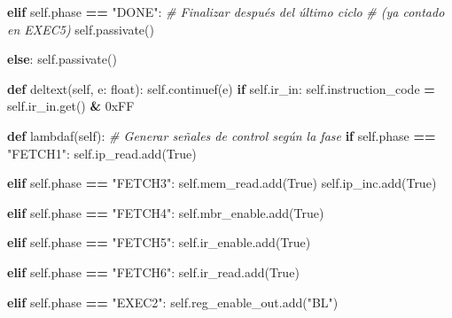 \documentclass[12pt,oneside]{templates/unerthesis}
\newenvironment{Shaded}{\begin{snugshade}}{\end{snugshade}}
\newcommand{\BaseNTok}[1]{\textcolor[rgb]{0.00,0.00,0.81}{#1}}
\newcommand{\BuiltInTok}[1]{#1}
\newcommand{\CommentTok}[1]{\textcolor[rgb]{0.56,0.35,0.01}{\textit{#1}}}
\newcommand{\ControlFlowTok}[1]{\textcolor[rgb]{0.13,0.29,0.53}{\textbf{#1}}}
\newcommand{\KeywordTok}[1]{\textcolor[rgb]{0.13,0.29,0.53}{\textbf{#1}}}
\newcommand{\NormalTok}[1]{#1}
\newcommand{\OperatorTok}[1]{\textcolor[rgb]{0.81,0.36,0.00}{\textbf{#1}}}
\newcommand{\StringTok}[1]{\textcolor[rgb]{0.31,0.60,0.02}{#1}}
\newcommand{\VariableTok}[1]{\textcolor[rgb]{0.00,0.00,0.00}{#1}}
\begin{document}
\begin{Shaded}
\begin{Highlighting}[]
        \ControlFlowTok{elif} \VariableTok{self}\NormalTok{.phase }\OperatorTok{==} \StringTok{"DONE"}\NormalTok{:}
            \CommentTok{\# Finalizar después del último ciclo }
            \CommentTok{\# (ya contado en EXEC5)}
            \VariableTok{self}\NormalTok{.passivate()}
        
        \ControlFlowTok{else}\NormalTok{:}
            \VariableTok{self}\NormalTok{.passivate()}
    
    \KeywordTok{def}\NormalTok{ deltext(}\VariableTok{self}\NormalTok{, e: }\BuiltInTok{float}\NormalTok{):}
        \VariableTok{self}\NormalTok{.continuef(e)}
        \ControlFlowTok{if} \VariableTok{self}\NormalTok{.ir\_in:}
            \VariableTok{self}\NormalTok{.instruction\_code }\OperatorTok{=} \VariableTok{self}\NormalTok{.ir\_in.get() }\OperatorTok{\&} \BaseNTok{0xFF}
    
    \KeywordTok{def}\NormalTok{ lambdaf(}\VariableTok{self}\NormalTok{):}
        \CommentTok{\# Generar señales de control según la fase}
        \ControlFlowTok{if} \VariableTok{self}\NormalTok{.phase }\OperatorTok{==} \StringTok{"FETCH1"}\NormalTok{:}
            \VariableTok{self}\NormalTok{.ip\_read.add(}\VariableTok{True}\NormalTok{)}
        
        \ControlFlowTok{elif} \VariableTok{self}\NormalTok{.phase }\OperatorTok{==} \StringTok{"FETCH3"}\NormalTok{:}
            \VariableTok{self}\NormalTok{.mem\_read.add(}\VariableTok{True}\NormalTok{)}
            \VariableTok{self}\NormalTok{.ip\_inc.add(}\VariableTok{True}\NormalTok{)}
        
        \ControlFlowTok{elif} \VariableTok{self}\NormalTok{.phase }\OperatorTok{==} \StringTok{"FETCH4"}\NormalTok{:}
            \VariableTok{self}\NormalTok{.mbr\_enable.add(}\VariableTok{True}\NormalTok{)}
        
        \ControlFlowTok{elif} \VariableTok{self}\NormalTok{.phase }\OperatorTok{==} \StringTok{"FETCH5"}\NormalTok{:}
            \VariableTok{self}\NormalTok{.ir\_enable.add(}\VariableTok{True}\NormalTok{)}
        
        \ControlFlowTok{elif} \VariableTok{self}\NormalTok{.phase }\OperatorTok{==} \StringTok{"FETCH6"}\NormalTok{:}
            \VariableTok{self}\NormalTok{.ir\_read.add(}\VariableTok{True}\NormalTok{)}
        
        \ControlFlowTok{elif} \VariableTok{self}\NormalTok{.phase }\OperatorTok{==} \StringTok{"EXEC2"}\NormalTok{:}
            \VariableTok{self}\NormalTok{.reg\_enable\_out.add(}\StringTok{"BL"}\NormalTok{)}
        

\end{Highlighting}
\end{Shaded}
\end{document}
